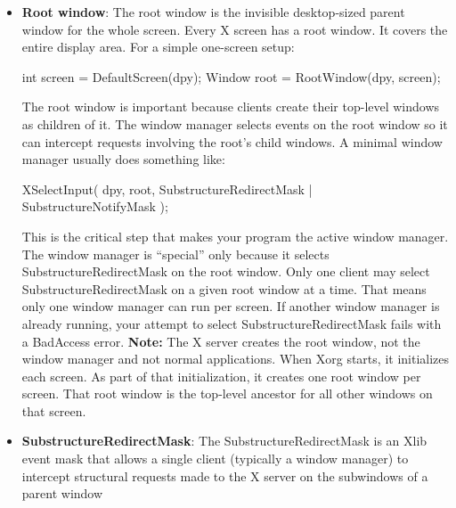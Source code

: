 \documentclass{report}
\begin{document}
\begin{itemize}
        \item \textbf{Root window}: The root window is the invisible desktop-sized parent window for the whole screen.
            \bigbreak \noindent 
            Every X screen has a root window. It covers the entire display area.
            \bigbreak \noindent 
            For a simple one-screen setup:
            \bigbreak \noindent 
            \begin{cppcode}
                int screen = DefaultScreen(dpy);
                Window root = RootWindow(dpy, screen);
            \end{cppcode}
            \bigbreak \noindent 
            The root window is important because clients create their top-level windows as children of it.
            \bigbreak \noindent 
            The window manager selects events on the root window so it can intercept requests involving the root’s child windows.
            \bigbreak \noindent 
            A minimal window manager usually does something like:
            \bigbreak \noindent 
            \begin{cppcode}
            XSelectInput(
                dpy,
                root,
                SubstructureRedirectMask | SubstructureNotifyMask
            );
        \end{cppcode}
        \bigbreak \noindent 
        This is the critical step that makes your program the active window manager.
        \bigbreak \noindent 
        The window manager is “special” only because it selects SubstructureRedirectMask on the root window.
        \bigbreak \noindent 
        Only one client may select SubstructureRedirectMask on a given root window at a time.
        \bigbreak \noindent 
        That means only one window manager can run per screen.
        \bigbreak \noindent 
        If another window manager is already running, your attempt to select SubstructureRedirectMask fails with a BadAccess error.
        \bigbreak \noindent 
        \textbf{Note:} The X server creates the root window, not the window manager and not normal applications.
        \bigbreak \noindent 
        When Xorg starts, it initializes each screen. As part of that initialization, it creates one root window per screen. That root window is the top-level ancestor for all other windows on that screen.
    \item \textbf{SubstructureRedirectMask}:  The SubstructureRedirectMask is an Xlib event mask that allows a single client (typically a window manager) to intercept structural requests made to the X server on the subwindows of a parent window

\end{itemize}
\end{document}
